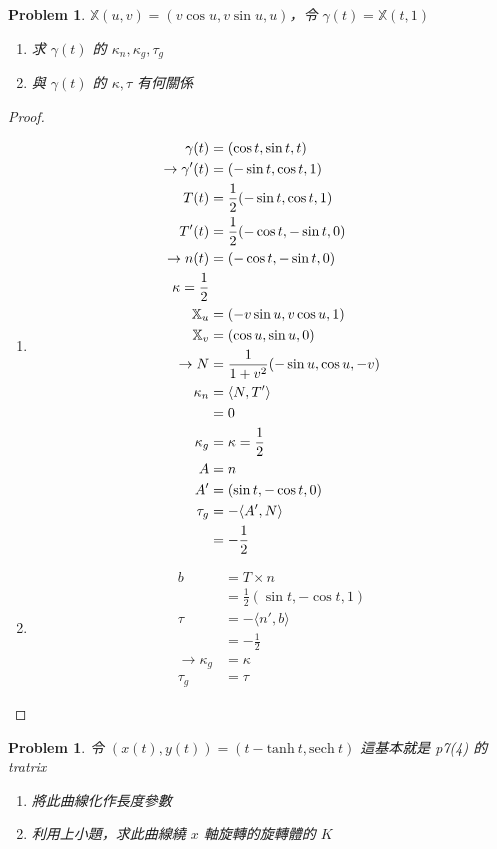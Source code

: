 \documentclass[10pt,a4paper]{article}
\newcounter{theProblemCounter}
\newtheorem{problem}[theProblemCounter]{Problem}
\begin{document}
\setcounter{theProblemCounter}{4}
\begin{problem}
$\mathbb{X}(u, v) = (v\cos u, v\sin u, u)$，令 $\gamma(t)=\mathbb{X}(t, 1)$
\begin{enumerate}[{ (}a{)}]
\item 求 $\gamma(t)$ 的 $\kappa_n, \kappa_g, \tau_g$
\item 與 $\gamma(t)$ 的 $\kappa, \tau$ 有何關係
\end{enumerate}
\end{problem}
\begin{proof}
\begin{enumerate}[{ (}a{)}]
\item
\begin{align*}
\gamma(t)&=(\cos t, \sin t, t)\\
\rightarrow \gamma'(t)&=(-\sin t,\cos t,1)\\
T(t)&=\frac{1}{2}(-\sin t,\cos t,1)\\
T'(t)&=\frac{1}{2}(-\cos t,-\sin t,0)\\
\rightarrow n(t)&=(-\cos t,-\sin t,0)\\
\kappa = \frac{1}{2}\\
\mathbb{X}_u&=(-v\sin u,v\cos u,1)\\
\mathbb{X}_v&=(\cos u,\sin u,0)\\
\rightarrow N&=\frac{1}{1+v^2}(-\sin u, \cos u,-v)\\
\kappa_n&=\langle N,T'\rangle\\
&=0\\
\kappa_g&=\kappa = \frac{1}{2}\\
A&=n\\
A'&=(\sin t,-\cos t,0)\\
\tau_g&=-\langle A',N\rangle\\
&=-\frac{1}{2}
\end{align*}
\item
\begin{align*}
b&=T\times n\\
&=\frac{1}{2}(\sin t,-\cos t, 1)\\
\tau&=-\langle n', b\rangle\\
&=-\frac{1}{2}\\
\rightarrow \kappa_g&=\kappa\\
\tau_g &= \tau
\end{align*}
\end{enumerate}
\end{proof}

\setcounter{theProblemCounter}{5}
\begin{problem}
令 $(x(t), y(t)) = (t-\mathrm{tanh\ } t, \mathrm{sech\ } t)$ 這基本就是 p7(4) 的 tratrix
\begin{enumerate}[{ (}a{)}]
\item 將此曲線化作長度參數
\item 利用上小題，求此曲線繞 $x$ 軸旋轉的旋轉體的 $K$
\end{enumerate}
\end{problem}
\end{document}
